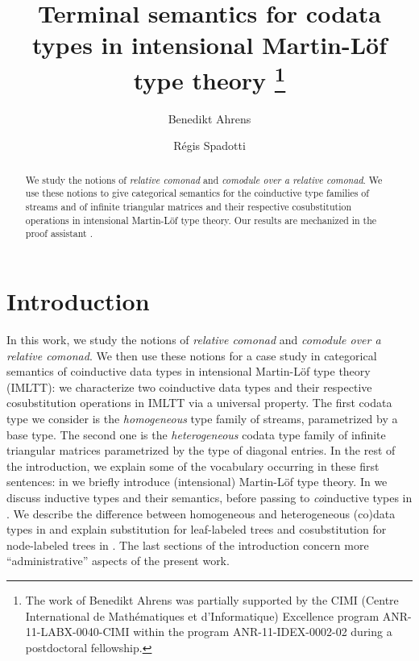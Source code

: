 \documentclass[a4paper,USenglish]{lipics}
\title{Terminal semantics for codata types in intensional Martin-L\"of type theory%
\footnote{The work of Benedikt Ahrens was partially supported by the CIMI (Centre International de Mathématiques et d'Informatique) Excellence program ANR-11-LABX-0040-CIMI within the program ANR-11-IDEX-0002-02 during a postdoctoral fellowship.}
}
\author{Benedikt Ahrens}
\author{R\'egis Spadotti}
\affil{
Institut de Recherche en Informatique de Toulouse\\
Universit\'e Paul Sabatier, 
Toulouse}
\begin{document}
\maketitle


\begin{abstract}
 We study the notions of \emph{relative comonad} and \emph{comodule over a relative comonad}.
 We use these notions to give categorical semantics for the coinductive type families of streams and
 of infinite triangular matrices and their respective cosubstitution operations in intensional Martin-L\"of type theory.
 Our results are mechanized in the proof assistant \coq.
\end{abstract}




\section{Introduction}
 
 In this work, we study the notions of \emph{relative comonad} and \emph{comodule over a relative comonad}.
 We then use these notions for a case study in categorical semantics of coinductive data types in intensional Martin-Löf type theory (IMLTT): 
 we characterize two coinductive data types and their respective cosubstitution operations 
 in IMLTT via a universal property.
 The first codata type we consider is the \emph{homogeneous} type family of streams, parametrized by a base type.
 The second one is the \emph{heterogeneous} codata type family of infinite triangular matrices parametrized by the type of diagonal entries.
  In the rest of the introduction, we explain some of the vocabulary occurring in these first sentences:
  in  we briefly introduce (intensional) Martin-Löf type theory. In  we discuss inductive types and their semantics,
  before passing to \emph{co}inductive types in .
  We describe
  the difference between homogeneous and heterogeneous (co)data types in  and explain substitution for leaf-labeled trees and cosubstitution for node-labeled trees in .
  The last sections of the introduction concern more \enquote{administrative} aspects of the present work.
  
  
\end{document}
